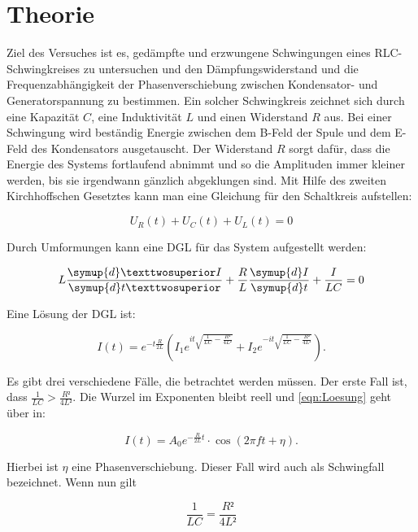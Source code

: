 \section{Theorie}
\label{sec:Theorie}

Ziel des Versuches ist es, gedämpfte und erzwungene Schwingungen eines
RLC-Schwingkreises zu untersuchen und den Dämpfungswiderstand und die 
Frequenzabhängigkeit der Phasenverschiebung zwischen Kondensator- und 
Generatorspannung zu bestimmen. 
Ein solcher Schwingkreis zeichnet sich durch eine Kapazität $C$, 
eine Induktivität $L$ und einen Widerstand $R$ aus. Bei einer 
Schwingung wird beständig Energie zwischen dem B-Feld der Spule und
dem E-Feld des Kondensators ausgetauscht. Der Widerstand $R$ sorgt
dafür, dass die Energie des Systems fortlaufend abnimmt und so die 
Amplituden immer kleiner werden, bis sie irgendwann gänzlich abgeklungen 
sind. 
Mit Hilfe des zweiten Kirchhoffschen Gesetztes kann man eine Gleichung 
für den Schaltkreis aufstellen: 

\begin{equation*}
U_R(t) + U_C(t) + U_L(t) = 0 
\end{equation*}

Durch Umformungen kann eine DGL für das System aufgestellt werden: 

\begin{equation}
L\frac{\symup{d}²I}{\symup{d}t²}+\frac{R}{L} \frac{\symup{d}I}{\symup{d}t}+\frac{I}{LC} = 0
\end{equation}

Eine Lösung der DGL ist: 

\begin{equation}
I(t) = e^{-t\frac{R}{2L}}\left(I_1 e^{it\sqrt{\frac{1}{LC}-\frac{R²}{4L²}}}+I_2 e^{-it\sqrt{\frac{1}{LC}-\frac{R²}{4L²}}} \right).
\label{eqn:Loesung}
\end{equation}

Es gibt drei verschiedene Fälle, die betrachtet werden müssen. 
Der erste Fall ist, dass $\frac{1}{LC} > \frac{R²}{4L²}$. Die Wurzel im Exponenten
bleibt reell und \eqref{eqn:Loesung} geht über in: 

\begin{equation*}
I(t) = A_0 e^{-\frac{R}{2L}t}\cdot \cos\left({2\pi ft+\eta}\right).
\end{equation*}

Hierbei ist $\eta$ eine Phasenverschiebung. Dieser Fall wird auch als 
Schwingfall bezeichnet. 
Wenn nun gilt

\begin{equation*}
\frac{1}{LC} = \frac{R²}{4L²}
\end{equation*}

